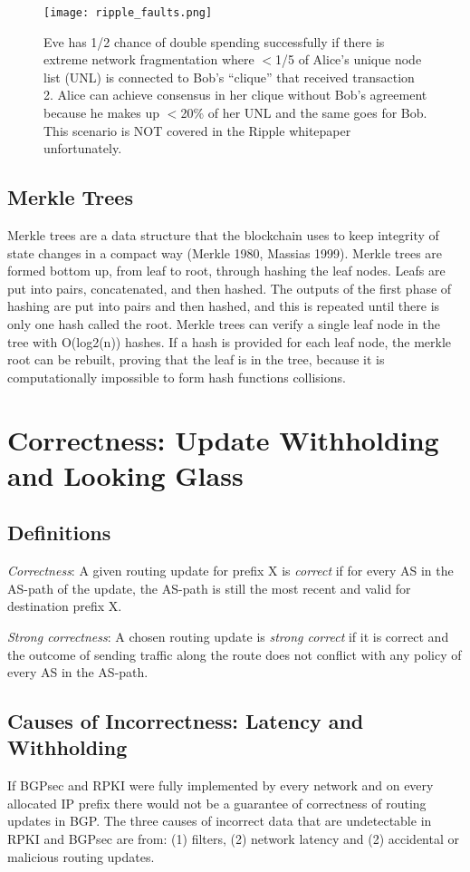 \documentclass[letterpaper, 10 pt, conference]{ieeeconf}  %
\begin{document}
\begin{figure}[ht!]
	\centering
	\texttt{[image: ripple\_faults.png]}
    \caption{Eve has 1/2 chance of double spending successfully if there is extreme network fragmentation where $<$1/5 of Alice’s unique node list (UNL) is connected to Bob’s “clique” that received transaction 2. Alice can achieve consensus in her clique without Bob’s agreement because he makes up $<$20\% of her UNL and the same goes for Bob. This scenario is NOT covered in the Ripple whitepaper unfortunately.}
   	\end{figure}

\subsection{Merkle Trees}

Merkle trees are a data structure that the blockchain uses to keep integrity of state changes in a compact way (Merkle 1980, Massias 1999). Merkle trees are formed bottom up, from leaf to root, through hashing the leaf nodes. Leafs are put into pairs, concatenated, and then hashed. The outputs of the first phase of hashing are put into pairs and then hashed, and this is repeated until there is only one hash called the root. Merkle trees can verify a single leaf node in the tree with O(log2(n)) hashes. If a hash is provided for each leaf node, the merkle root can be rebuilt, proving that the leaf is in the tree, because it is computationally impossible to form hash functions collisions. 



\section{Correctness: Update Withholding and Looking Glass}

\subsection{Definitions}
\textit{Correctness}: A given routing update for prefix X is \textit{correct} if for every AS in the AS-path of the update, the AS-path is still the most recent and valid for destination prefix X. 

\textit{Strong correctness}: A chosen routing update is \textit{strong correct} if it is correct and the outcome of sending traffic along the route does not conflict with any policy of every AS in the AS-path. 


\subsection{Causes of Incorrectness: Latency and Withholding}
If BGPsec and RPKI were fully implemented by every network and on every allocated IP prefix there would not be a guarantee of correctness of routing updates in BGP. The three causes of incorrect data that are undetectable in RPKI and BGPsec are from: (1) filters, (2) network latency and (2) accidental or malicious routing updates. 
\end{document}

